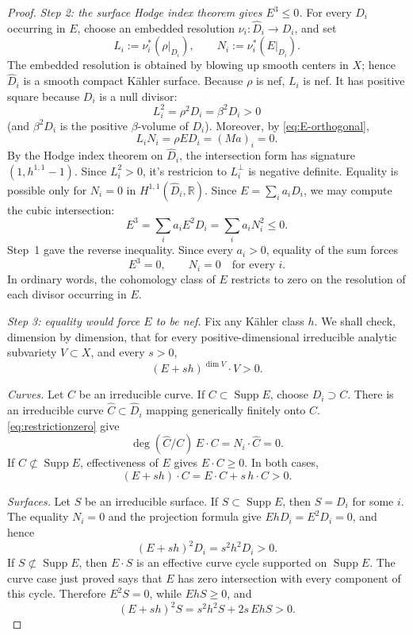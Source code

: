 \documentclass[10pt,a4paper]{amsart}
\def\R{\mathbb{R}}
\begin{document}
\begin{proof}
\smallskip
\noindent\emph{Step 2: the surface Hodge index theorem gives
$E^3\leq0$.}
For every $D_i$ occurring in $E$, choose an embedded resolution
$\nu_i:\widehat D_i\to D_i$, and set
\[
 L_i:=\nu_i^*(\rho|_{D_i}),\qquad
 N_i:=\nu_i^*(E|_{D_i}).
\]
The embedded resolution is obtained by blowing up smooth centers in
$X$; hence $\widehat D_i$ is a smooth compact K\"ahler surface.
Because $\rho$ is nef, $L_i$ is nef.  It has positive square because
$D_i$ is a null divisor:
\[
 L_i^2=\rho^2D_i=\beta^2D_i>0
\]
(and $\beta^2D_i$ is the positive $\beta$-volume of $D_i$).
Moreover, by \eqref{eq:E-orthogonal},
\[
 L_iN_i=\rho ED_i=(Ma)_i=0.
\]
By the Hodge index theorem on $\widehat{D}_i$, the intersection form has signature $(1,h^{1,1}-1)$. Since $L_i^2>0$, it's restricion to $L_i^\perp$ is negative definite. 
Equality is possible only for  $N_i=0$ in $H^{1,1}(\widehat D_i,\R)$.
Since $E=\sum_i a_iD_i$, we may compute the cubic intersection:
\[
 E^3=\sum_i a_iE^2D_i=\sum_i a_iN_i^2\leq0.
\]
Step~1 gave the reverse inequality.  Since every $a_i>0$, equality of
the sum forces 
\begin{equation}\label{eq:restrictionzero}
 E^3=0,\qquad N_i=0\quad\text{for every }i.
\end{equation}
In ordinary words, the cohomology class of $E$ restricts to zero on
the resolution of each divisor occurring in $E$.

\smallskip
\noindent\emph{Step 3: equality would force $E$ to be nef.}
Fix any K\"ahler class $h$.  We shall check, dimension by dimension,
that for every positive-dimensional irreducible analytic subvariety
$V\subset X$, and every $s>0$,
\begin{equation}\label{eq:DPpositive}
 (E+sh)^{\dim V}\cdot V>0.
\end{equation}

\emph{Curves.}
Let $C$ be an irreducible curve.  If
$C\subset\operatorname{Supp}E$, choose $D_i\supset C$.  There is an
irreducible curve $\widehat C\subset\widehat D_i$ mapping generically
finitely onto $C$.  
\eqref{eq:restrictionzero} give
\[
 \deg(\widehat C/C)\,E\cdot C=N_i\cdot\widehat C=0.
\]
If $C\not\subset\operatorname{Supp}E$, effectiveness of $E$ gives
$E\cdot C\geq0$.  In both cases,
\[
 (E+sh)\cdot C=E\cdot C+s\,h\cdot C>0.
\]

\emph{Surfaces.}
Let $S$ be an irreducible surface.  If
$S\subset\operatorname{Supp}E$, then $S=D_i$ for some $i$.
The equality $N_i=0$ and the projection formula give
$EhD_i=E^2D_i=0$, and hence
\[
 (E+sh)^2D_i=s^2h^2D_i>0.
\]
If $S\not\subset\operatorname{Supp}E$, then $E\cdot S$ is an
effective curve cycle supported on $\operatorname{Supp}E$.  The curve
case just proved says that $E$ has zero intersection with every
component of this cycle.  Therefore
$E^2S=0$, while $EhS\geq0$, and
\[
 (E+sh)^2S=s^2h^2S+2s\,EhS>0.
\]


\end{proof}
\end{document}
